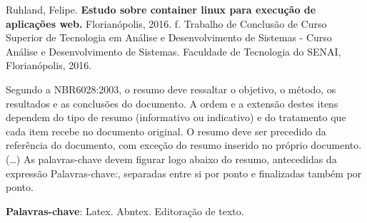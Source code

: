 
\noindent
Ruhland, Felipe. \textbf{Estudo sobre container linux para execução de aplicações web.}
Florianópolis, 2016. \pageref{nropaginas}f. Trabalho de Conclusão de Curso Superior de Tecnologia em
Análise e Desenvolvimento de Sistemas - Curso Análise e Desenvolvimento de Sistemas. Faculdade de Tecnologia do
SENAI, Florianópolis, 2016.

\vspace{1cm}
\setlength{\absparsep}{18pt} %
\begin{resumo}
 Segundo a NBR6028:2003, o resumo deve ressaltar o
 objetivo, o método, os resultados e as conclusões do documento. A ordem e a extensão
 destes itens dependem do tipo de resumo (informativo ou indicativo) e do
 tratamento que cada item recebe no documento original. O resumo deve ser
 precedido da referência do documento, com exceção do resumo inserido no
 próprio documento. (\ldots) As palavras-chave devem figurar logo abaixo do
 resumo, antecedidas da expressão Palavras-chave:, separadas entre si por
 ponto e finalizadas também por ponto.

 \textbf{Palavras-chave}: Latex. Abntex. Editoração de texto.
\end{resumo}
